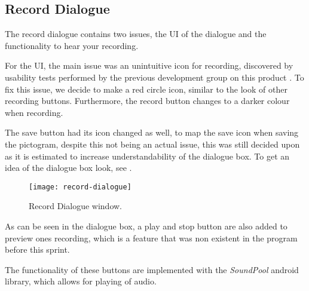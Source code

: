 \subsection{Record Dialogue}
The record dialogue contains two issues, the UI of the dialogue and the functionality to hear your recording.

For the UI, the main issue was an unintuitive icon for recording, discovered by usability tests performed by the previous development group on this product \citep{misc:oldcroc}. To fix this issue, we decide to make a red circle icon, similar to the look of other recording buttons. Furthermore, the record button changes to a darker colour when recording. 

The save button had its icon changed as well, to map the save icon when saving the pictogram, despite this not being an actual issue, this was still decided upon as it is estimated to increase understandability of the dialogue box.
To get an idea of the dialogue box look, see .

\begin{figure}[h]
     \centering
     \texttt{[image: record-dialogue]}
     \caption{Record Dialogue window.}
     \label{fig:record-dialogue}
\end{figure}

As can be seen in the dialogue box, a play and stop button are also added to preview ones recording, which is a feature that was non existent in the program before this sprint.

The functionality of these buttons are implemented with the \textit{SoundPool} android library, which allows for playing of audio.

